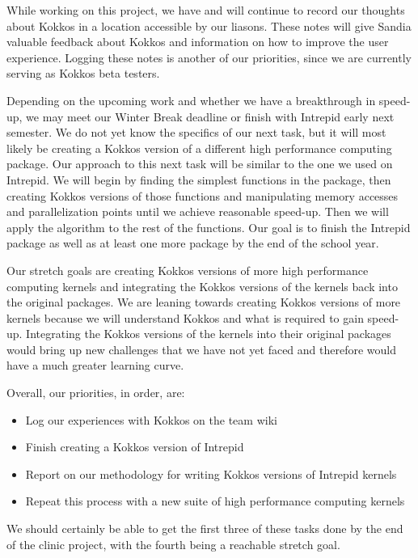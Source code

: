\documentclass[midyear]{hmcclinic}
\begin{document}
While working on this project, we have and will continue to record our thoughts
about Kokkos in a location accessible by our liasons.  These notes will give
Sandia valuable feedback about Kokkos and information on how to improve the user
experience. Logging these notes is another of our priorities, since we are
currently serving as Kokkos beta testers. 

Depending on the upcoming work and whether we have a breakthrough in speed-up,
we may meet our Winter Break deadline or finish with Intrepid early next
semester. We do not yet know the specifics of our next task, but it will most
likely be creating a Kokkos version of a different high performance computing
package.  Our approach to this next task will be similar to the one we used on
Intrepid. We will begin by finding the simplest functions in the package, then
creating Kokkos versions of those functions and manipulating memory accesses and
parallelization points until we achieve reasonable speed-up. Then we will apply
the algorithm to the rest of the functions. Our goal is to finish the Intrepid
package as well as at least one more package by the end of the school year. 

Our stretch goals are creating Kokkos versions of more high performance
computing kernels and integrating the Kokkos versions of the kernels back into
the original packages. We are leaning towards creating Kokkos versions of more
kernels because we will understand Kokkos and what is required to gain speed-up.
Integrating the Kokkos versions of the kernels into their original packages
would bring up new challenges that we have not yet faced and therefore would
have a much greater learning curve. 

Overall, our priorities, in order, are: 
\begin{itemize}
	\item Log our experiences with Kokkos on the team wiki
	
	\item Finish creating a Kokkos version of Intrepid

	\item Report on our methodology for writing Kokkos versions of Intrepid
            kernels
	
        \item Repeat this process with a new suite of high performance computing
            kernels
\end{itemize}
We should certainly be able to get the first three of these tasks done by the
end of the clinic project, with the fourth being a reachable stretch goal.
\end{document}
